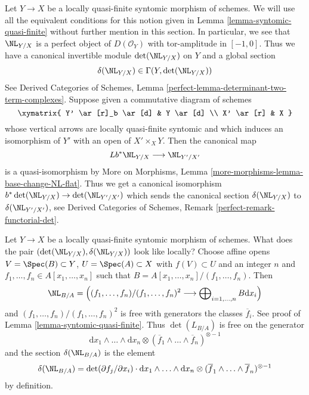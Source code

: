 \medskip\noindent
Let $Y \to X$ be a locally quasi-finite syntomic morphism of schemes.
We will use all the equivalent conditions for this notion given in
Lemma \ref{lemma-syntomic-quasi-finite} without further mention in
this section. In particular, we see that $\NL_{Y/X}$ is a perfect
object of $D(\mathcal{O}_Y)$ with tor-amplitude in $[-1, 0]$. Thus
we have a canonical invertible module
$\det(\NL_{Y/X})$ on $Y$ and a global section
$$
\delta(\NL_{Y/X}) \in \Gamma(Y, \det(\NL_{Y/X}))
$$
See Derived Categories of Schemes, Lemma
\ref{perfect-lemma-determinant-two-term-complexes}.
Suppose given a commutative diagram of schemes
$$
\xymatrix{
Y' \ar[r]_b \ar[d] & Y \ar[d] \\
X' \ar[r] & X
}
$$
whose vertical arrows are locally quasi-finite syntomic and which
induces an isomorphism of $Y'$ with an open of $X' \times_X Y$.
Then the canonical map
$$
Lb^*\NL_{Y/X} \longrightarrow \NL_{Y'/X'}
$$
is a quasi-isomorphism by
More on Morphisms, Lemma \ref{more-morphisms-lemma-base-change-NL-flat}.
Thus we get a canonical isomorphism
$b^*\det(\NL_{Y/X}) \to \det(\NL_{Y'/X'})$ which sends the
canonical section $\delta(\NL_{Y/X})$ to $\delta(\NL_{Y'/ X'})$, see
Derived Categories of Schemes, Remark \ref{perfect-remark-functorial-det}.

\begin{remark}
\label{remark-local-description-delta}
Let $Y \to X$ be a locally quasi-finite syntomic morphism of schemes.
What does the pair $(\det(\NL_{Y/X}), \delta(\NL_{Y/X}))$ look
like locally? Choose affine opens $V = \Spec(B) \subset Y$,
$U = \Spec(A) \subset X$ with $f(V) \subset U$ and an integer $n$ and
$f_1, \ldots, f_n \in A[x_1, \ldots, x_n]$ such that
$B = A[x_1, \ldots, x_n]/(f_1, \ldots, f_n)$. Then
$$
\NL_{B/A} = \left(
(f_1, \ldots, f_n)/(f_1, \ldots, f_n)^2
\longrightarrow
\bigoplus\nolimits_{i = 1, \ldots, n} B \text{d} x_i\right)
$$
and $(f_1, \ldots, f_n)/(f_1, \ldots, f_n)^2$ is free with generators
the classes $\overline{f}_i$. See proof of
Lemma \ref{lemma-syntomic-quasi-finite}.
Thus $\det(L_{B/A})$ is free on the generator
$$
\text{d}x_1 \wedge \ldots \wedge \text{d}x_n
\otimes
(\overline{f}_1 \wedge \ldots \wedge \overline{f}_n)^{\otimes -1}
$$
and the section $\delta(\NL_{B/A})$ is the element
$$
\delta(\NL_{B/A}) =
\det(\partial f_j/ \partial x_i) \cdot
\text{d}x_1 \wedge \ldots \wedge \text{d}x_n
\otimes
(\overline{f}_1 \wedge \ldots \wedge \overline{f}_n)^{\otimes -1}
$$
by definition.
\end{remark}

